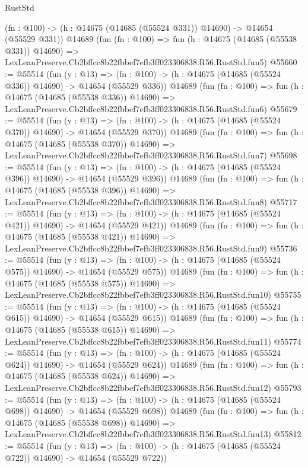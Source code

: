 \begin{lexlean}{RustStd}
\begin{coremodule}
    (fn : @100) -> (h : @14675 (@14685 (@55524 @331)) @14690) -> @14654 (@55529 @331))
    @14689
    (fun (fn : @100) =>
    fun (h : @14675 (@14685 (@55538 @331)) @14690) =>
    LexLeanPreserve.Cb2bffcc8b22fbbef7efb3ff023306838.R56.RustStd.fun5)
@55660 := @55514
    (fun (y : @13) =>
    (fn : @100) -> (h : @14675 (@14685 (@55524 @336)) @14690) -> @14654 (@55529 @336))
    @14689
    (fun (fn : @100) =>
    fun (h : @14675 (@14685 (@55538 @336)) @14690) =>
    LexLeanPreserve.Cb2bffcc8b22fbbef7efb3ff023306838.R56.RustStd.fun6)
@55679 := @55514
    (fun (y : @13) =>
    (fn : @100) -> (h : @14675 (@14685 (@55524 @370)) @14690) -> @14654 (@55529 @370))
    @14689
    (fun (fn : @100) =>
    fun (h : @14675 (@14685 (@55538 @370)) @14690) =>
    LexLeanPreserve.Cb2bffcc8b22fbbef7efb3ff023306838.R56.RustStd.fun7)
@55698 := @55514
    (fun (y : @13) =>
    (fn : @100) -> (h : @14675 (@14685 (@55524 @396)) @14690) -> @14654 (@55529 @396))
    @14689
    (fun (fn : @100) =>
    fun (h : @14675 (@14685 (@55538 @396)) @14690) =>
    LexLeanPreserve.Cb2bffcc8b22fbbef7efb3ff023306838.R56.RustStd.fun8)
@55717 := @55514
    (fun (y : @13) =>
    (fn : @100) -> (h : @14675 (@14685 (@55524 @421)) @14690) -> @14654 (@55529 @421))
    @14689
    (fun (fn : @100) =>
    fun (h : @14675 (@14685 (@55538 @421)) @14690) =>
    LexLeanPreserve.Cb2bffcc8b22fbbef7efb3ff023306838.R56.RustStd.fun9)
@55736 := @55514
    (fun (y : @13) =>
    (fn : @100) -> (h : @14675 (@14685 (@55524 @575)) @14690) -> @14654 (@55529 @575))
    @14689
    (fun (fn : @100) =>
    fun (h : @14675 (@14685 (@55538 @575)) @14690) =>
    LexLeanPreserve.Cb2bffcc8b22fbbef7efb3ff023306838.R56.RustStd.fun10)
@55755 := @55514
    (fun (y : @13) =>
    (fn : @100) -> (h : @14675 (@14685 (@55524 @615)) @14690) -> @14654 (@55529 @615))
    @14689
    (fun (fn : @100) =>
    fun (h : @14675 (@14685 (@55538 @615)) @14690) =>
    LexLeanPreserve.Cb2bffcc8b22fbbef7efb3ff023306838.R56.RustStd.fun11)
@55774 := @55514
    (fun (y : @13) =>
    (fn : @100) -> (h : @14675 (@14685 (@55524 @624)) @14690) -> @14654 (@55529 @624))
    @14689
    (fun (fn : @100) =>
    fun (h : @14675 (@14685 (@55538 @624)) @14690) =>
    LexLeanPreserve.Cb2bffcc8b22fbbef7efb3ff023306838.R56.RustStd.fun12)
@55793 := @55514
    (fun (y : @13) =>
    (fn : @100) -> (h : @14675 (@14685 (@55524 @698)) @14690) -> @14654 (@55529 @698))
    @14689
    (fun (fn : @100) =>
    fun (h : @14675 (@14685 (@55538 @698)) @14690) =>
    LexLeanPreserve.Cb2bffcc8b22fbbef7efb3ff023306838.R56.RustStd.fun13)
@55812 := @55514
    (fun (y : @13) =>
    (fn : @100) -> (h : @14675 (@14685 (@55524 @722)) @14690) -> @14654 (@55529 @722))

\end{coremodule}
\end{lexlean}
